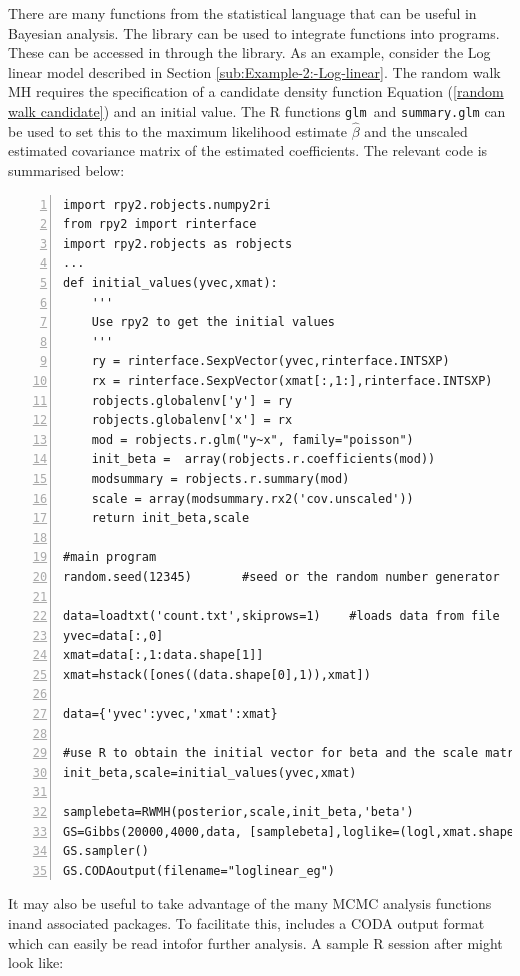 \documentclass[article]{jss}
\begin{document}
There are many functions from the  statistical
language \citet{R} that can be useful in Bayesian analysis. The   library can be
used to integrate  functions into  programs. These can
be accessed in  through the  
library. As an example, consider the Log linear model described in
Section \ref{sub:Example-2:-Log-linear}. The random walk MH requires
the specification of a candidate density function Equation
(\ref{random walk candidate}) and an initial value. The R functions
\texttt{glm }and \texttt{summary.glm} can be used to set this to the
maximum likelihood estimate $\hat{\beta}$ and the unscaled estimated
covariance matrix of the estimated coefficients. The relevant code is
summarised below:


\begin{lstlisting}[basicstyle={\scriptsize},numbers=left,tabsize=4]
import rpy2.robjects.numpy2ri
from rpy2 import rinterface
import rpy2.robjects as robjects
...
def initial_values(yvec,xmat):
    '''
    Use rpy2 to get the initial values
    '''
    ry = rinterface.SexpVector(yvec,rinterface.INTSXP)
    rx = rinterface.SexpVector(xmat[:,1:],rinterface.INTSXP)
    robjects.globalenv['y'] = ry
    robjects.globalenv['x'] = rx
    mod = robjects.r.glm("y~x", family="poisson")
    init_beta =  array(robjects.r.coefficients(mod))
    modsummary = robjects.r.summary(mod)
    scale = array(modsummary.rx2('cov.unscaled'))
    return init_beta,scale

#main program
random.seed(12345)       #seed or the random number generator

data=loadtxt('count.txt',skiprows=1)    #loads data from file
yvec=data[:,0]
xmat=data[:,1:data.shape[1]]
xmat=hstack([ones((data.shape[0],1)),xmat])

data={'yvec':yvec,'xmat':xmat} 

#use R to obtain the initial vector for beta and the scale matrix
init_beta,scale=initial_values(yvec,xmat)

samplebeta=RWMH(posterior,scale,init_beta,'beta')
GS=Gibbs(20000,4000,data, [samplebeta],loglike=(logl,xmat.shape[1],'yvec'))
GS.sampler()
GS.CODAoutput(filename="loglinear_eg") 

\end{lstlisting}


It may also be useful to take advantage of the many MCMC analysis
functions inand associated packages. To facilitate this,
 includes a CODA
\citet{Rnews:Plummer+Best+Cowles+Vines:2006} output format which can
easily be read intofor further analysis. A sample R
session after  might look like:
\end{document}

